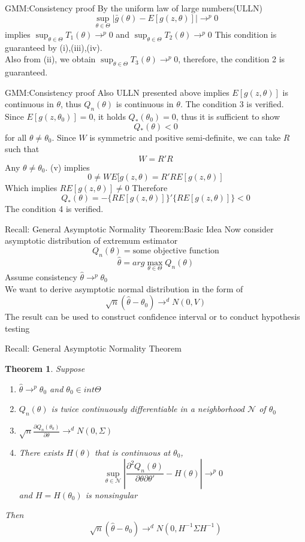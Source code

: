 \documentclass{beamer}
\newtheorem{thm}{Theorem}[subsection]
\begin{document}
\begin{frame}{GMM:Consistency proof}
	By the uniform law of large numbers(ULLN)
	\[\sup_{\theta \in \Theta} |\bar{g}(\theta) - E[g(z,\theta)]| \rightarrow^p 0\]
	implies $\sup_{\theta \in \Theta} T_1(\theta) \rightarrow^p 0 $ and $\sup_{\theta \in \Theta} T_2(\theta) \rightarrow^p 0 $
	This condition is guaranteed by (i),(iii),(iv). \\
	Also from (ii), we obtain $\sup_{\theta \in \Theta} T_3(\theta) \rightarrow^p 0$, therefore, the condition 2 is guaranteed.
\end{frame}
\begin{frame}{GMM:Consistency proof}
	Also ULLN presented above implies $E[g(z,\theta)]$ is continuous in $\theta$, thus $Q_n(\theta)$ is continuous in $\theta$. The condition 3 is verified. \\
	Since $E[g(z,\theta_0)]=0$, it holds $Q_*(\theta_0)=0$, thus it is sufficient to show
	\[Q_*(\theta) < 0\]
	for all $\theta \neq \theta_0$. Since $W$ is symmetric and positive semi-definite, we can take $R$ such that 
	\[W = R'R\]
	Any $\theta \neq \theta_0$. (v) implies 
	\[0 \neq WE[g(z,\theta) = R'RE[g(z,\theta)]\]
		Which implies $RE[g(z,\theta)] \neq 0$
		Therefore
		\[Q_*(\theta) = -\{RE[g(z,\theta)]\}' \{RE[g(z,\theta)]\}<0\]
		The condition 4 is verified.
\end{frame}
\begin{frame}{Recall: General Asymptotic Normality Theorem:Basic Idea}
	Now consider asymptotic distribution of extremum estimator
	\[Q_n(\theta) = \text{some objective function}\]
	\[\hat{\theta} = arg \max_{\theta \in \Theta} Q_n(\theta)\]
	Assume consistency $\hat{\theta} \rightarrow^p \theta_0$ \\
	We want to derive asymptotic normal distribution in the form of 
	\[\sqrt{n} (\hat{\theta} - \theta_0) \rightarrow^d N(0,V)\] 
	The result can be used to construct confidence interval or to conduct hypothesis testing
\end{frame}
\begin{frame}{Recall: General Asymptotic Normality Theorem}
	\begin{thm}
		Suppose
		\begin{enumerate}
			\item $\hat{\theta} \rightarrow^p \theta_0$ and $\theta_0 \in int\Theta$
			\item $Q_n(\theta)$ is twice continuously differentiable in a neighborhood $\mathcal{N}$ of $\theta_0$
			\item $\sqrt{n} \frac{\partial Q_n(\theta_0)}{\partial \theta} \rightarrow^d N(0,\Sigma)$	
			\item There exists $H(\theta)$ that is continuous at $\theta_0$,
				\[\sup_{\theta \in \mathcal{N}} |\frac{\partial^2 Q_n(\theta)}{\partial \theta \partial \theta'} - H(\theta)| \rightarrow^p 0\]
				and $H = H(\theta_0)$ is nonsingular 
		\end{enumerate}
	Then
	\[\sqrt{n}(\hat{\theta} - \theta_0) \rightarrow^d N(0,H^{-1}\Sigma H^{-1})\]
	\end{thm}
\end{frame}
\end{document}
